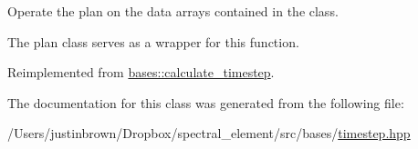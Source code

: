 Operate the plan on the data arrays contained in the class. 



 

 

 The plan class serves as a wrapper for this function. 

Reimplemented from \hyperlink{classbases_1_1calculate__timestep_a5a88213985ce200a1fb2a09365a6e531}{bases\-::calculate\-\_\-timestep}.



The documentation for this class was generated from the following file\-:\begin{DoxyCompactItemize}
\item 
/\-Users/justinbrown/\-Dropbox/spectral\-\_\-element/src/bases/\hyperlink{timestep_8hpp}{timestep.\-hpp}\end{DoxyCompactItemize}
